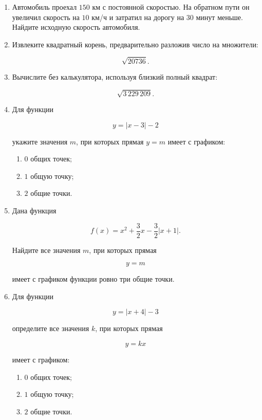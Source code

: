 \documentclass[a4paper,12pt]{article}
\begin{document}
\begin{enumerate}[label=\textbf{\arabic*.},start=4]

\item
Автомобиль проехал \(150\) км с постоянной скоростью.
На обратном пути он увеличил скорость на \(10\) км/ч
и затратил на дорогу на \(30\) минут меньше.
Найдите исходную скорость автомобиля.

\item
Извлеките квадратный корень,
предварительно разложив число на множители:

\[
\sqrt{20736}.
\]

\item
Вычислите без калькулятора,
используя близкий полный квадрат:

\[
\sqrt{3\,229\,209}.
\]

\item
Для функции

\[
y=|x-3|-2
\]

укажите значения \(m\), при которых прямая \(y=m\)
имеет с графиком:

\begin{enumerate}[label=\arabic*)]
\item \(0\) общих точек;
\item \(1\) общую точку;
\item \(2\) общие точки.
\end{enumerate}

\item
Дана функция

\[
f(x)
=
x^2+\frac32x-\frac32|x+1|.
\]

Найдите все значения \(m\),
при которых прямая

\[
y=m
\]

имеет с графиком функции ровно три общие точки.

\item
Для функции

\[
y=|x+4|-3
\]

определите все значения \(k\),
при которых прямая

\[
y=kx
\]

имеет с графиком:

\begin{enumerate}[label=\arabic*)]
\item \(0\) общих точек;
\item \(1\) общую точку;
\item \(2\) общие точки.
\end{enumerate}

\end{enumerate}
\end{document}
